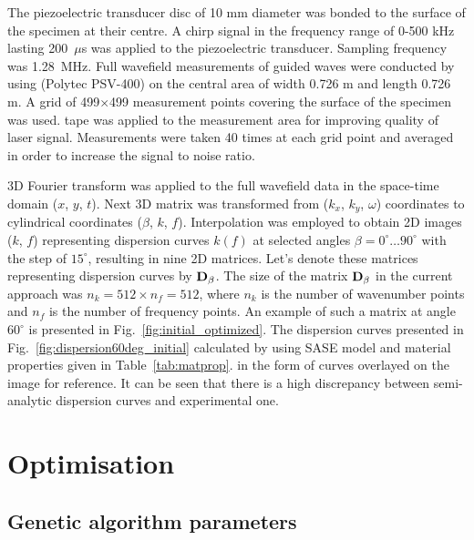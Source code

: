 The piezoelectric transducer disc of 10 mm diameter was bonded to the surface of the specimen at their centre. 
A chirp signal in the frequency range of 0-500 kHz lasting 200~\(\mu\)s was applied to the piezoelectric transducer. 
Sampling frequency was 1.28~MHz. Full wavefield measurements of guided waves were conducted by using 
  (Polytec PSV-400) on the central area of width 0.726 m and length 0.726 m. 
A grid of 499\(\times\)499 measurement points covering the surface of the specimen  was used. 
 tape was applied to the measurement area for improving   quality of laser signal. 
Measurements were taken 40 times at each grid point and averaged in order to increase the signal to noise ratio.

3D Fourier transform was applied to the full wavefield data in the space-time domain 
(\(x\), \(y\), \(t\)).
 Next 3D matrix was transformed from (\(k_x\), \(k_y\), \(\omega\)) coordinates to cylindrical coordinates (\(\beta\), \(k\), \(f\)). 
Interpolation was employed to obtain 2D images (\(k\), \(f\)) representing dispersion curves \(k(f)\) at selected angles \(\beta = 0^{\circ} \ldots 90^{\circ}\) with the step of \(15^{\circ}\), resulting in nine 2D matrices. 
Let's denote these matrices representing dispersion curves by \(\mathbf{D}_{\beta}\). The size of the matrix  \(\mathbf{D}_{\beta}\) in the current approach was \(n_k=512 \times n_f= 512\), where \(n_k\) is the number of wavenumber points 
and \(n_f\) is the number of frequency points.  
An example of such a matrix at  angle \(60^{\circ}\) is presented in Fig.~\ref{fig:initial_optimized}. 
The dispersion curves presented in Fig.~\ref{fig:dispersion60deg_initial}  calculated by using  SASE model and material properties  given in Table~\ref{tab:matprop}.
 in the form of   curves  overlayed on the image for reference. 
It can be seen that there is a high discrepancy between semi-analytic dispersion curves and  experimental one. 
	
\section{Optimisation \label{sec:optimization}}
 
\subsection{Genetic algorithm parameters}
	
